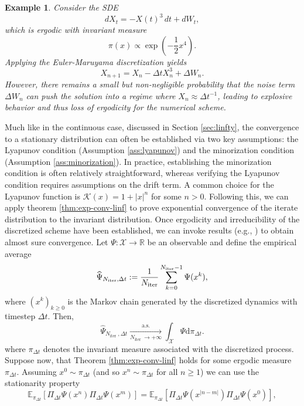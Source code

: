\documentclass[11pt, twoside]{report}
\newtheorem{example}[theorem]{Example}
\begin{document}
\begin{example}
Consider the SDE
\[
dX_t = -X(t)^3\,dt + dW_t,
\]
which is ergodic with invariant measure
\[
\pi(x) \propto \exp\left(-\frac{1}{2}x^4\right).
\]
Applying the Euler-Maruyama discretization yields
\[
X_{n+1} = X_n - \Delta t X_n^3 + \Delta W_n.
\]
However, there remains a small but non-negligible probability that the noise term $\Delta W_n$ can push the solution into a regime where $X_n \approx \Delta t^{-1}$, leading to explosive behavior and thus loss of ergodicity for the numerical scheme.
\end{example}
Much like in the continuous case, discussed in Section \ref{sec:linfty}, the convergence to a stationary distribution can often be established via two key assumptions: the Lyapunov condition (Assumption \ref{ass:lyapunov}) and the minorization condition (Assumption
\ref{ass:minorization}). In practice, establishing the minorization condition is often relatively straightforward, whereas verifying the Lyapunov condition requires assumptions on the drift term\cite{mattingly2002ergodicity}. A common choice for the Lyapunov function is $\mathcal{K}(x) = 1 + |x|^n$ for some $n > 0$. Following this, we can apply theorem \ref{thm:exp-conv-linf} to prove exponential convergence of the iterate distribution to the invariant distribution. Once ergodicity and irreducibility of the discretized scheme have been established, we can invoke results (e.g., \cite[Chapter~17]{meyn2012-oq}) to obtain almost sure convergence. Let \(\Psi:\mathcal X\to\mathbb R\) be an observable and define the empirical average
\[
\widehat\Psi_{N_{\rm iter},\Delta t}
:=
\frac{1}{N_{\rm iter}}
\sum_{k=0}^{N_{\rm iter}-1}\Psi(x^k),
\]
where \((x^k)_{k\ge0}\) is the Markov chain generated by the discretized dynamics with timestep \(\Delta t\). Then,
\begin{equation}
\widehat{\Psi}_{N_{\text {iter }}, \Delta t} \xrightarrow[N_{\text {iter }} \rightarrow+\infty]{\text { a.s. }} \int_{\mathcal{X}} \Psi \mathrm{d} \pi_{\Delta t} .
\end{equation}
where $\pi_{\Delta t}$ denotes the invariant measure associated with the discretized process.
Suppose now, that Theorem \ref{thm:exp-conv-linf} holds for some ergodic measure $\pi_{\Delta t}$. Assuming $x^0 \sim \pi_{\Delta t}$ (and so $x^n \sim \pi_{\Delta t}$ for all $n\geq 1$) we can use the stationarity property
\begin{equation}
\mathbb{E}_{\pi_{\Delta t}}\left[\Pi_{\Delta t} \Psi\left(x^n\right) \Pi_{\Delta t} \Psi\left(x^m\right)\right]=\mathbb{E}_{\pi_{\Delta t}}\left[\Pi_{\Delta t} \Psi\left(x^{|n-m|}\right) \Pi_{\Delta t} \Psi\left(x^0\right)\right],
\end{equation}
\end{document}
